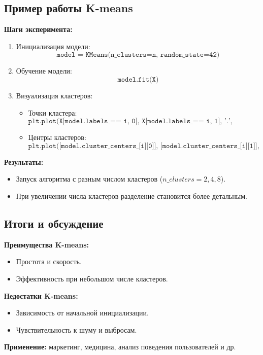 \documentclass[a4paper,12pt]{article}
\begin{document}
\subsection*{Пример работы K-means}
\textbf{Шаги эксперимента:}
\begin{enumerate}
    \item Инициализация модели:
    \[
    \texttt{model = KMeans(n\_clusters=n, random\_state=42)}
    \]
    \item Обучение модели:
    \[
    \texttt{model.fit(X)}
    \]
    \item Визуализация кластеров:
    \begin{itemize}
        \item Точки кластера:
        \[
        \texttt{plt.plot(X[model.labels\_ == i, 0], X[model.labels\_ == i, 1], '.', color=colors[i])}
        \]
        \item Центры кластеров:
        \[
        \texttt{plt.plot([model.cluster\_centers\_[i][0]], [model.cluster\_centers\_[i][1]], 'x', c=colors[i], markersize=20)}
        \]
    \end{itemize}
\end{enumerate}

\textbf{Результаты:}
\begin{itemize}
    \item Запуск алгоритма с разным числом кластеров ($n\_clusters = 2, 4, 8$).
    \item При увеличении числа кластеров разделение становится более детальным.
\end{itemize}

\subsection*{Итоги и обсуждение}
\textbf{Преимущества K-means:}
\begin{itemize}
    \item Простота и скорость.
    \item Эффективность при небольшом числе кластеров.
\end{itemize}
\textbf{Недостатки K-means:}
\begin{itemize}
    \item Зависимость от начальной инициализации.
    \item Чувствительность к шуму и выбросам.
\end{itemize}
\textbf{Применение:} маркетинг, медицина, анализ поведения пользователей и др.
\end{document}
